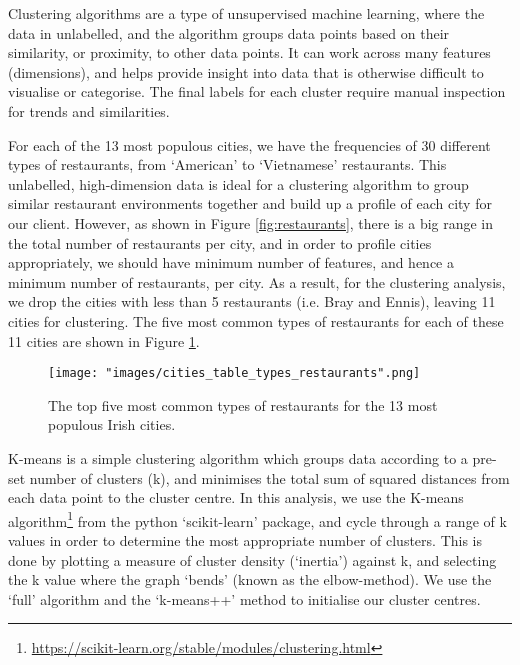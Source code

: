 \documentclass[a4paper,11pt]{article}
\begin{document}
Clustering algorithms are a type of unsupervised machine learning, where the data in unlabelled, and the algorithm groups data points based on their similarity, or proximity, to other data points. It can work across many features (dimensions), and helps provide insight into data that is otherwise difficult to visualise or categorise. The final labels for each cluster require manual inspection for trends and similarities.

For each of the 13 most populous cities, we have the frequencies of 30 different types of restaurants, from `American' to `Vietnamese' restaurants. This unlabelled, high-dimension data is ideal for a clustering algorithm to group similar restaurant environments together and build up a profile of each city for our client. However, as shown in Figure \ref{fig:restaurants}, there is a big range in the total number of restaurants per city, and in order to profile cities appropriately, we should have minimum number of features, and hence a minimum number of restaurants, per city. As a result, for the clustering analysis, we drop the cities with less than 5 restaurants (i.e. Bray and Ennis), leaving 11 cities for clustering. The five most common types of restaurants for each of these 11 cities are shown in Figure \ref{fig:5 common restaurants}.
%
\begin{figure}[htb]
   \centering
   \texttt{[image: "images/cities\_table\_types\_restaurants".png]}
      \caption{The top five most common types of restaurants for the 13 most populous Irish cities.}
      \label{fig:5 common restaurants}
\end{figure}
%

K-means is a simple clustering algorithm which groups data according to a pre-set number of clusters (k), and minimises the total sum of squared distances from each data point to the cluster centre. In this analysis, we use the K-means algorithm\footnote{\url{https://scikit-learn.org/stable/modules/clustering.html}} from the python `scikit-learn' package, and cycle through a range of k values in order to determine the most appropriate number of clusters. This is done by plotting a measure of cluster density (`inertia') against k, and selecting the k value where the graph `bends' (known as the elbow-method). We use the `full' algorithm and the `k-means++' method to initialise our cluster centres.
\end{document}

